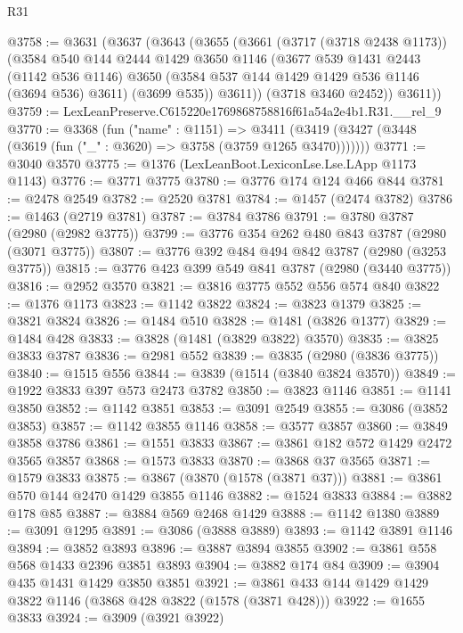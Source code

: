 \begin{lexlean}{R31}
\begin{coremodule}
@3758 := @3631
    (@3637
      (@3643
        (@3655
          (@3661
            (@3717 (@3718 @2438 @1173))
            (@3584
              @540
              @144
              @2444
              @1429
              @3650
              @1146
              (@3677
                @539
                @1431
                @2443
                (@1142 @536 @1146)
                @3650
                (@3584 @537 @144 @1429 @1429 @536 @1146 (@3694 @536) @3611)
                (@3699 @535))
              @3611))
          (@3718 @3460 @2452))
        @3611))
@3759 := LexLeanPreserve.C615220e1769868758816f61a54a2e4b1.R31.__rel_9
@3770 := @3368
    (fun ("name" : @1151) =>
    @3411 (@3419 (@3427 (@3448 (@3619 (fun ("_" : @3620) => @3758 (@3759 @1265 @3470)))))))
@3771 := @3040 @3570
@3775 := @1376 (LexLeanBoot.LexiconLse.Lse.LApp @1173 @1143)
@3776 := @3771 @3775
@3780 := @3776 @174 @124 @466 @844
@3781 := @2478 @2549
@3782 := @2520 @3781
@3784 := @1457 (@2474 @3782)
@3786 := @1463 (@2719 @3781)
@3787 := @3784 @3786
@3791 := @3780 @3787 (@2980 (@2982 @3775))
@3799 := @3776 @354 @262 @480 @843 @3787 (@2980 (@3071 @3775))
@3807 := @3776 @392 @484 @494 @842 @3787 (@2980 (@3253 @3775))
@3815 := @3776 @423 @399 @549 @841 @3787 (@2980 (@3440 @3775))
@3816 := @2952 @3570
@3821 := @3816 @3775 @552 @556 @574 @840
@3822 := @1376 @1173
@3823 := @1142 @3822
@3824 := @3823 @1379
@3825 := @3821 @3824
@3826 := @1484 @510
@3828 := @1481 (@3826 @1377)
@3829 := @1484 @428
@3833 := @3828 (@1481 (@3829 @3822) @3570)
@3835 := @3825 @3833 @3787
@3836 := @2981 @552
@3839 := @3835 (@2980 (@3836 @3775))
@3840 := @1515 @556
@3844 := @3839 (@1514 (@3840 @3824 @3570))
@3849 := @1922 @3833 @397 @573 @2473 @3782
@3850 := @3823 @1146
@3851 := @1141 @3850
@3852 := @1142 @3851
@3853 := @3091 @2549
@3855 := @3086 (@3852 @3853)
@3857 := @1142 @3855 @1146
@3858 := @3577 @3857
@3860 := @3849 @3858 @3786
@3861 := @1551 @3833
@3867 := @3861 @182 @572 @1429 @2472 @3565 @3857
@3868 := @1573 @3833
@3870 := @3868 @37 @3565
@3871 := @1579 @3833
@3875 := @3867 (@3870 (@1578 (@3871 @37)))
@3881 := @3861 @570 @144 @2470 @1429 @3855 @1146
@3882 := @1524 @3833
@3884 := @3882 @178 @85
@3887 := @3884 @569 @2468 @1429
@3888 := @1142 @1380
@3889 := @3091 @1295
@3891 := @3086 (@3888 @3889)
@3893 := @1142 @3891 @1146
@3894 := @3852 @3893
@3896 := @3887 @3894 @3855
@3902 := @3861 @558 @568 @1433 @2396 @3851 @3893
@3904 := @3882 @174 @84
@3909 := @3904 @435 @1431 @1429 @3850 @3851
@3921 := @3861 @433 @144 @1429 @1429 @3822 @1146 (@3868 @428 @3822 (@1578 (@3871 @428)))
@3922 := @1655 @3833
@3924 := @3909 (@3921 @3922)

\end{coremodule}
\end{lexlean}
